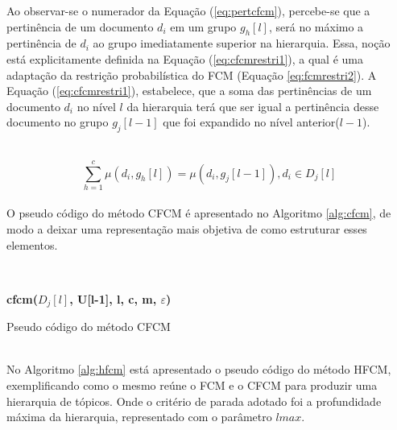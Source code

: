 Ao observar-se o numerador da Equação (\ref{eq:pertcfcm}), percebe-se que a pertinência
de um documento $d_i$ em um grupo $g_h[l]$, será no máximo a pertinência de $d_i$ ao grupo
imediatamente superior na hierarquia. Essa, noção está explicitamente definida na Equação
(\ref{eq:cfcmrestri1}), a qual é uma adaptação da restrição probabilística do FCM (Equação
\ref{eq:fcmrestri2}). A Equação (\ref{eq:cfcmrestri1}), estabelece, que a soma das pertinências de
um documento $d_i$ no nível $l$ da hierarquia terá que ser igual a pertinência desse documento no
grupo $g_j[l-1]$ que foi expandido no nível anterior($l-1$).

\leavevmode\\
\begin{equation}
  \sum_{h=1}^c \mu(d_i,g_h[l]) = \mu(d_i,g_j[l-1]), d_i \in D_j[l]
  \label{eq:cfcmrestri1}
\end{equation}
\leavevmode\\

O pseudo código do método CFCM é apresentado no Algoritmo \ref{alg:cfcm}, de modo a deixar uma
representação mais objetiva de como estruturar esses elementos. 

\leavevmode\\
\begin{algorithm}[!htp] 
  \SetAlgoLined 
  \textbf{{\color{blue}cfcm}($D_j[l]$, U[l-1], l, c, m, $\varepsilon$)}\\
  \caption{Pseudo código do método CFCM}
  \label{alg:cfcm} 
\end{algorithm}
\leavevmode\\

No Algoritmo \ref{alg:hfcm} está apresentado o pseudo código do método HFCM, exemplificando como o
mesmo reúne o FCM e o CFCM para produzir uma hierarquia de tópicos. Onde o critério de parada
adotado foi a profundidade máxima da hierarquia, representado com o parâmetro $lmax$.

